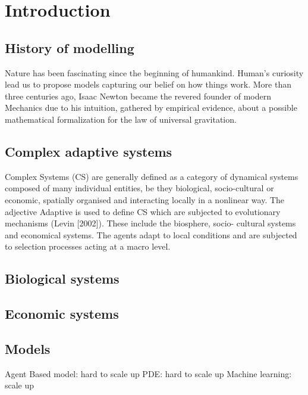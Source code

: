 %
\chapter{Introduction}
\label{sec:intro}


\section{History of modelling}
\label{sec:intro:history}
Nature has been fascinating since the beginning of humankind. Human's curiosity lead us to propose models capturing our belief on how things work. More than three centuries ago, Isaac Newton became the revered founder of modern Mechanics due to his intuition, gathered by empirical evidence, about a possible mathematical formalization for the law of universal gravitation. \cite{Equations2021}

\section{Complex adaptive systems}
\label{sec:intro:cas}
Complex Systems (CS) are generally defined as a category of dynamical systems composed of many individual entities, be they biological, socio-cultural or economic, spatially organised and interacting locally in a nonlinear way. The adjective Adaptive is used to define CS which are subjected to evolutionary mechanisms (Levin [2002]). These include the biosphere, socio- cultural systems and economical systems. The agents adapt to local conditions and are subjected to selection processes acting at a macro level.

\section{Biological systems}

\section{Economic systems}

\section{Models}

\begin{outline}
    \1 Agent Based model: hard to scale up
    \1 PDE: hard to scale up
    \1 Machine learning: scale up
\end{outline}



